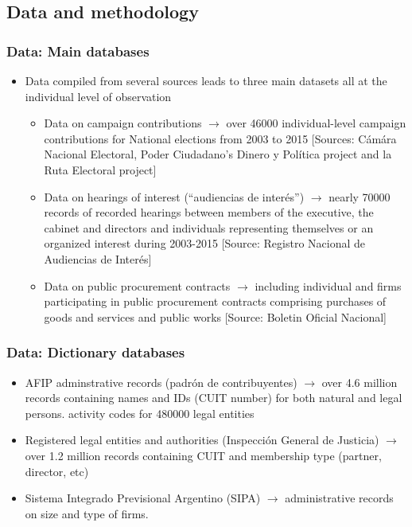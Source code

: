 \documentclass[handout,final,xcolor=dvipsnames]{beamer}
\begin{document}
  \subsection{Data and methodology}
  
 \begin{frame}\frametitle{Data: Main databases}
\begin{itemize}\itemsep 15pt
\item Data compiled from several sources leads to three main datasets
  all at the individual level of observation
  \begin{itemize}\itemsep 5pt \medskip
    \item Data on campaign contributions $\longrightarrow$ over 46000
  individual-level campaign contributions for National elections from
  2003 to 2015 [Sources: Cámára Nacional Electoral, Poder Ciudadano's
  Dinero y Política project and la Ruta Electoral project]
  \item Data on hearings of interest (``audiencias de interés'')
    $\longrightarrow$ nearly 70000 records of recorded hearings
    between members of the executive, the cabinet and directors and
    individuals representing themselves or an organized interest
    during 2003-2015
    [Source: Registro Nacional de Audiencias de Interés]
\item Data on public procurement contracts $\longrightarrow$ including
  individual and firms participating in public procurement contracts
  comprising purchases of goods and services and public works [Source:
  Boletin Oficial Nacional]
  \end{itemize}
\end{itemize}
\end{frame}

\begin{frame}\frametitle{Data: Dictionary databases}
  \begin{itemize}\itemsep 15pt
  \item AFIP adminstrative records (padrón de contribuyentes)
    $\longrightarrow$ over 4.6 million records containing names and
    IDs (CUIT number) for both natural and legal persons.    activity codes for 480000 legal entities
    \item Registered legal entities and
      authorities (Inspección General de Justicia) $\longrightarrow$
      over 1.2 million records containing CUIT and membership type
      (partner, director, etc)
      \item Sistema Integrado Previsional Argentino (SIPA)
        $\longrightarrow$ administrative records on size and type of
        firms. 
\end{itemize}
  \end{frame}
\end{document}
